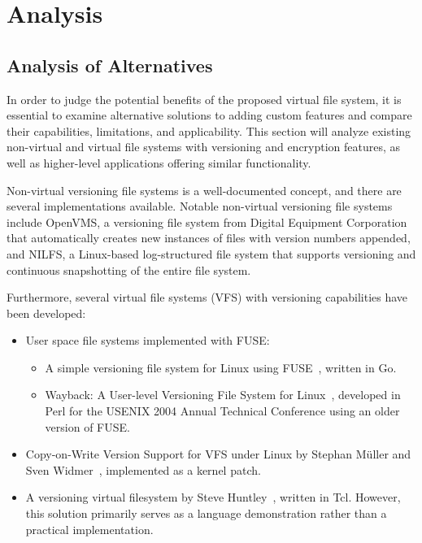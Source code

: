 \chapter{Analysis}
\label{chap:analysis}

\section{Analysis of Alternatives}\label{sec:alternatives}

In order to judge the potential benefits of the proposed virtual file system, it is essential to examine alternative solutions to adding custom features and compare their capabilities, limitations, and applicability.
This section will analyze existing non-virtual and virtual file systems with versioning and encryption features, as well as higher-level applications offering similar functionality.

Non-virtual versioning file systems is a well-documented concept, and there are several implementations available.
Notable non-virtual versioning file systems include OpenVMS, a versioning file system from Digital Equipment Corporation that automatically creates new instances of files with version numbers appended, and NILFS, a Linux-based log-structured file system that supports versioning and continuous snapshotting of the entire file system.

Furthermore, several virtual file systems (VFS) with versioning capabilities have been developed:

\begin{itemize}
    \item User space file systems implemented with FUSE:
    \begin{itemize}
        \item A simple versioning file system for Linux using FUSE~\cite{simple_vfs}, written in Go.
        \item Wayback: A User-level Versioning File System for Linux~\cite{wayback_vfs}, developed in Perl for the USENIX 2004 Annual Technical Conference using an older version of FUSE\@.
    \end{itemize}
    \item Copy-on-Write Version Support for VFS under Linux by Stephan Müller and Sven Widmer~\cite{vvfs}, implemented as a kernel patch.
    \item A versioning virtual filesystem by Steve Huntley~\cite{huntley_vvfs}, written in Tcl.
    However, this solution primarily serves as a language demonstration rather than a practical implementation.
\end{itemize}

